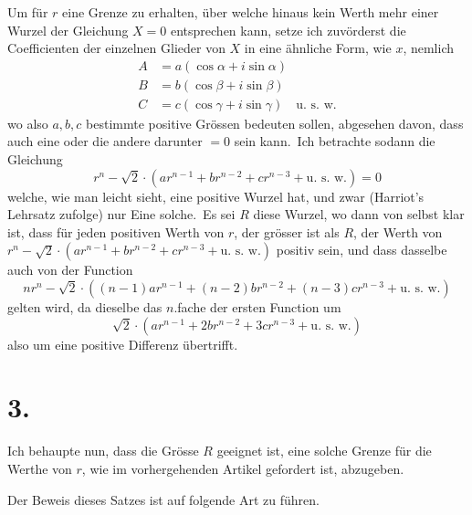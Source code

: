 \documentclass[12pt,a4paper]{article}
\theoremstyle{plain}
\begin{document}
Um für $r$ eine Grenze zu erhalten, über welche hinaus kein Werth mehr
einer Wurzel der Gleichung $X = 0$ entsprechen kann, setze ich zuvörderst die
Coefficienten der einzelnen Glieder von $X$ in eine ähnliche Form, wie $x$, nemlich
\begin{align*}
A &= a(\cos\alpha + i \sin\alpha) \\
B &= b(\cos\beta + i \sin\beta) \\
C &= c(\cos\gamma + i \sin\gamma) \quad \text{u.\ s.\ w.}
\end{align*}
wo also $a, b, c$ bestimmte positive Grössen bedeuten sollen, abgesehen davon,
dass auch eine oder die andere darunter $= 0$ sein kann.\ Ich betrachte sodann
die Gleichung
\[
r^n - \surd 2 \cdot (ar^{n-1} + br^{n-2} + cr^{n-3} + \text{u.\ s.\ w.}) = 0
\]
welche, wie man leicht sieht, eine positive Wurzel hat, und zwar (Harriot's Lehrsatz zufolge) nur Eine solche.\ Es sei $R$ diese Wurzel, wo dann von selbst klar
ist, dass für jeden positiven Werth von $r$, der grösser ist als $R$, der Werth von
$r^n - \surd 2 \cdot (ar^{n-1} + br^{n-2} + cr^{n-3} + \text{u.\ s.\ w.})$ positiv sein, und dass dasselbe auch
von der Function
\[
nr^n - \surd 2 \cdot ((n-1)ar^{n-1} + (n-2)br^{n-2} + (n-3)cr^{n-3} + \text{u.\ s.\ w.})
\]
gelten wird, da dieselbe das $n$.fache der ersten Function um
\[
\surd 2 \cdot (ar^{n-1} + 2br^{n-2} + 3cr^{n-3} + \text{u.\ s.\ w.})
\]
also um eine positive Differenz übertrifft.

\section*{3.}

Ich behaupte nun, dass die Grösse $R$ geeignet ist, eine solche Grenze für
die Werthe von $r$, wie im vorhergehenden Artikel gefordert ist, abzugeben.

Der Beweis dieses Satzes ist auf folgende Art zu führen.
\end{document}
